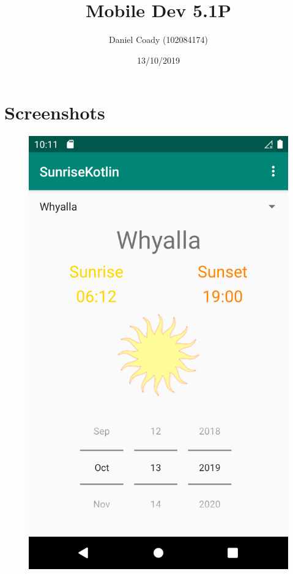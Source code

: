 \documentclass{scrartcl}
\title{Mobile Dev 5.1P}
\author{Daniel Coady (102084174)}
\date{13/10/2019}
\begin{document}
\maketitle

\section*{Screenshots}
\begin{figure}[h]
    \centering
    \includegraphics[scale=0.2]{images/screen1.png}

\end{figure}
\end{document}
